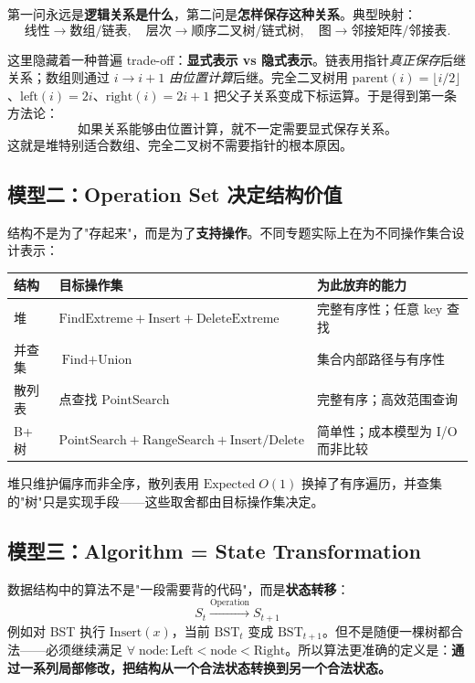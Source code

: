 \documentclass[11pt,a4paper,openany]{ctexbook}
\newcommand{\key}[1]{\textbf{\color{deep}#1}}
\begin{document}
第一问永远是\key{逻辑关系是什么}，第二问是\key{怎样保存这种关系}。典型映射：
\[
\text{线性}\rightarrow\text{数组/链表},\quad
\text{层次}\rightarrow\text{顺序二叉树/链式树},\quad
\text{图}\rightarrow\text{邻接矩阵/邻接表}.
\]

这里隐藏着一种普遍 trade-off：\key{显式表示 vs 隐式表示}。链表用指针\emph{真正保存}后继关系；数组则通过 $i\rightarrow i+1$ \emph{由位置计算}后继。完全二叉树用 $\text{parent}(i)=\lfloor i/2\rfloor$、$\text{left}(i)=2i$、$\text{right}(i)=2i+1$ 把父子关系变成下标运算。于是得到第一条方法论：
\[
\boxed{\text{如果关系能够由位置计算，就不一定需要显式保存关系。}}
\]
这就是堆特别适合数组、完全二叉树不需要指针的根本原因。

\subsection{模型二：Operation Set 决定结构价值}

结构不是为了"存起来"，而是为了\key{支持操作}。不同专题实际上在为不同操作集合设计表示：

\begin{longtable}{p{2.6cm}p{4.5cm}p{\dimexpr\linewidth-8.37cm\relax}}
\toprule
\textbf{结构} & \textbf{目标操作集} & \textbf{为此放弃的能力}\\
\midrule
堆 & $\text{FindExtreme}+\text{Insert}+\text{DeleteExtreme}$ & 完整有序性；任意 key 查找\\
\midrule
并查集 & $\text{Find}+\text{Union}$ & 集合内部路径与有序性\\
\midrule
散列表 & 点查找 $\text{PointSearch}$ & 完整有序；高效范围查询\\
\midrule
B+ 树 & $\text{PointSearch}+\text{RangeSearch}+\text{Insert/Delete}$ & 简单性；成本模型为 I/O 而非比较\\
\bottomrule
\end{longtable}

堆只维护偏序而非全序，散列表用 $\text{Expected}\;O(1)$ 换掉了有序遍历，并查集的"树"只是实现手段——这些取舍都由目标操作集决定。

\subsection{模型三：Algorithm = State Transformation}

数据结构中的算法不是"一段需要背的代码"，而是\key{状态转移}：
\[
\boxed{S_t\xrightarrow{\text{Operation}}S_{t+1}}
\]
例如对 BST 执行 $\text{Insert}(x)$，当前 $\text{BST}_t$ 变成 $\text{BST}_{t+1}$。但不是随便一棵树都合法——必须继续满足 $\forall\;\text{node}:\text{Left}<\text{node}<\text{Right}$。所以算法更准确的定义是：\textbf{通过一系列局部修改，把结构从一个合法状态转换到另一个合法状态。}
\end{document}
